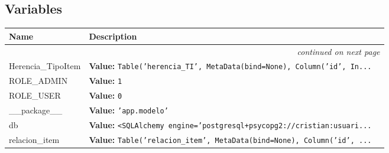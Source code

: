 
  \subsection{Variables}

    \vspace{-1cm}
\hspace{\varindent}\begin{longtable}{|p{\varnamewidth}|p{\vardescrwidth}|l}
\cline{1-2}
\cline{1-2} \centering \textbf{Name} & \centering \textbf{Description}& \\
\cline{1-2}
\endhead\cline{1-2}\multicolumn{3}{r}{\small\textit{continued on next page}}\\\endfoot\cline{1-2}
\endlastfoot\raggedright H\-e\-r\-e\-n\-c\-i\-a\-\_\-T\-i\-p\-o\-I\-t\-e\-m\- & \raggedright \textbf{Value:} 
{\tt Table('herencia\_TI', MetaData(bind=None), Column('id', In\texttt{...}}&\\
\cline{1-2}
\raggedright R\-O\-L\-E\-\_\-A\-D\-M\-I\-N\- & \raggedright \textbf{Value:} 
{\tt 1}&\\
\cline{1-2}
\raggedright R\-O\-L\-E\-\_\-U\-S\-E\-R\- & \raggedright \textbf{Value:} 
{\tt 0}&\\
\cline{1-2}
\raggedright \_\-\_\-p\-a\-c\-k\-a\-g\-e\-\_\-\_\- & \raggedright \textbf{Value:} 
{\tt \texttt{'}\texttt{app.modelo}\texttt{'}}&\\
\cline{1-2}
\raggedright d\-b\- & \raggedright \textbf{Value:} 
{\tt {\textless}SQLAlchemy engine='postgresql+psycopg2://cristian:usuari\texttt{...}}&\\
\cline{1-2}
\raggedright r\-e\-l\-a\-c\-i\-o\-n\-\_\-i\-t\-e\-m\- & \raggedright \textbf{Value:} 
{\tt Table('relacion\_item', MetaData(bind=None), Column('id', \texttt{...}}&\\
\cline{1-2}
\end{longtable}


